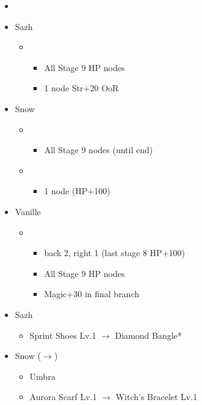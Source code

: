 \begin{menu}
	\begin{itemize}
	\paradigm
		\begin{itemize}
			\item {}%
				{\paradigmline[4]{\com}{\sen}{\med}}%
				{\paradigmline{\com}{\com}{\sab}}%
				{\paradigmline{(\sen)}{\sen}{(\med)}}%
				{\paradigmline{\rav}{\rav}{\rav}}%
				{\paradigmline{\sab}{\sen}{\sab}}%
				{\paradigmline{\rav}{\sen}{\rav}}%
		\end{itemize}
	\crystarium
		\begin{itemize}
			\item Sazh
				\begin{itemize}
					\item \com
						\begin{itemize}
							\item All Stage 9 HP nodes
							\item 1 node Str+20 OoR
						\end{itemize}
				\end{itemize}
			\item Snow
				\begin{itemize}
					\item \rav
						\begin{itemize}
							\item All Stage 9 nodes (until end)
						\end{itemize}
					\item \sen
						\begin{itemize}
							\item 1 node (HP+100)
						\end{itemize}
				\end{itemize}
			\item Vanille
				\begin{itemize}
					\item \rav
						\begin{itemize}
							\item back 2, right 1 (last stage 8 HP+100)
							\item All Stage 9 HP nodes
							\item Magic+30 in final branch
						\end{itemize}
				\end{itemize}								
		\end{itemize}
	\equip
		\begin{itemize}
			\item Sazh
				\begin{itemize}
					\item Sprint Shoes Lv.1 $\rightarrow$ Diamond Bangle*
				\end{itemize}
			\item Snow ($\rightarrow$)
				\begin{itemize}
					\item Umbra
					\item Aurora Scarf Lv.1 $\rightarrow$ Witch's Bracelet Lv.1
				\end{itemize}
		\end{itemize}
	\end{itemize}
\end{menu}

